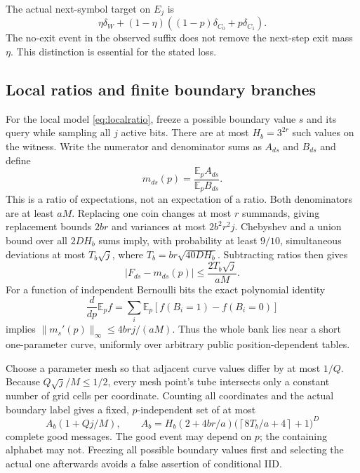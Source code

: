 \documentclass[11pt,letterpaper]{article}
\theoremstyle{definition}\newtheorem{definition}[theorem]{Definition}
\theoremstyle{remark}\newtheorem{remark}[theorem]{Remark}
\newcommand{\E}{\mathbb{E}}
\newcommand{\ceil}[1]{\left\lceil #1\right\rceil}
\begin{document}
The actual next-symbol target on $E_j$ is
\begin{equation}\label{eq:target}
 \eta\delta_W+(1-\eta)((1-p)\delta_{C_0}+p\delta_{C_1}).
\end{equation}
The no-exit event in the observed suffix does not remove the next-step exit mass $\eta$. This distinction is essential for the stated loss.

\subsection{Local ratios and finite boundary branches}
For the local model \eqref{eq:localratio}, freeze a possible boundary value $s$ and its query while sampling all $j$ active bits. There are at most $H_b=3^{2r}$ such values on the witness. Write the numerator and denominator sums as $A_{ds}$ and $B_{ds}$ and define
\[
 m_{ds}(p)=\frac{\E_p A_{ds}}{\E_p B_{ds}}.
\]
This is a ratio of expectations, not an expectation of a ratio. Both denominators are at least $aM$. Replacing one coin changes at most $r$ summands, giving replacement bounds $2br$ and variances at most $2b^2r^2j$. Chebyshev and a union bound over all $2DH_b$ sums imply, with probability at least $9/10$, simultaneous deviations at most $T_b\sqrt j$, where $T_b=br\sqrt{40DH_b}$. Subtracting ratios then gives
\begin{equation}\label{eq:localtube}
 |F_{ds}-m_{ds}(p)|\le\frac{2T_b\sqrt j}{aM}.
\end{equation}
For a function of independent Bernoulli bits the exact polynomial identity
\begin{equation}\label{eq:derivative}
 \frac{d}{dp}\E_pf=\sum_i\E_p[f(B_i=1)-f(B_i=0)]
\end{equation}
implies $\|m_s'(p)\|_\infty\le4brj/(aM)$. Thus the whole bank lies near a short one-parameter curve, uniformly over arbitrary public position-dependent tables.

Choose a parameter mesh so that adjacent curve values differ by at most $1/Q$. Because $Q\sqrt j/M\le1/2$, every mesh point's tube intersects only a constant number of grid cells per coordinate. Counting all coordinates and the actual boundary label gives a fixed, $p$-independent set of at most
\begin{equation}\label{eq:labels}
 A_b(1+Qj/M),\qquad
 A_b=H_b(2+4br/a)\bigl(\ceil{8T_b/a+4}+1\bigr)^D
\end{equation}
complete good messages. The good event may depend on $p$; the containing alphabet may not. Freezing all possible boundary values first and selecting the actual one afterwards avoids a false assertion of conditional IID.
\end{document}

